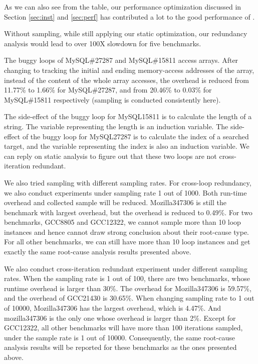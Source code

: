 As we can also see from the table, our performance optimization discussed in 
Section \ref{sec:inst} and \ref{sec:perf} has contributed
a lot to the good performance of \Tool.

Without sampling, while still applying our static optimization, our redundancy
analysis would lead to over 100X slowdown for five benchmarks.

The buggy loops of MySQL\#27287 and MySQL\#15811 access arrays. 
After changing to tracking the initial and ending memory-access addresses
of the array, instead of the content of the whole array accesses,
the overhead is reduced from 11.77\% to 1.66\% for MySQL\#27287, 
and from 20.46\% to 0.03\% for MySQL\#15811 respectively 
(sampling is conducted consistently here). 

The side-effect of the buggy loop for MySQL15811 is to calculate the length of a string. 
The variable representing the length is an induction variable. 
The side-effect of the buggy loop for MySQL27287 is to calculate the index of a searched target, 
and the variable representing the index is also an induction variable. 
We can reply on static analysis to figure out that these two loops are not cross-iteration redundant.

We also tried sampling with different sampling rates.
For cross-loop redundancy, we also conduct experiments under sampling rate 1
out of 1000. 
Both run-time overhead and collected sample will be reduced. Mozilla347306 
is still the benchmark with largest overhead, but the overhead is reduced to 0.49\%. For two benchmarks, GCC8805 and GCC12322, we cannot sample 
more than 10 loop instances and hence cannot draw strong conclusion
about their root-cause type. For all other benchmarks, we can 
still have more than 10 loop instances and get exactly the same 
root-cause analysis results presented above.

We also conduct cross-iteration redundant experiment under different sampling rates. When the sampling rate is 1 out of 100, there are two benchmarks, whose runtime overhead is larger than 30\%. The overhead for Mozilla347306 is 59.57\%, 
and the overhead of GCC21430 is 30.65\%. When changing sampling rate to 1
out of 10000, Mozilla347306 has the largest overhead, which is 4.47\%. And mozilla347306 is the only one whose overhead is larger than 2\%. Except for 
GCC12322, all other benchmarks will have more than 100 iterations sampled, under the sample rate is 1 out of 10000. Consequently, the same root-cause
analysis results will be reported for these benchmarks as the ones presented
above.
